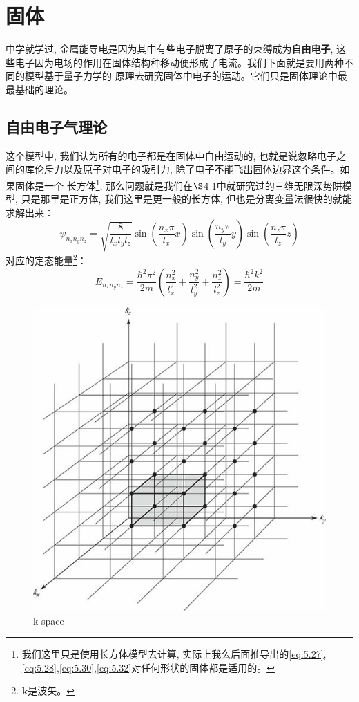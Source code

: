 \documentclass[a4paper,zihao=-4,linespread=1]{ctexrep}
\begin{document}
    \section{固体}
    中学就学过, 金属能导电是因为其中有些电子脱离了原子的束缚成为\textbf{自由电子}, 这些电子因为电场的作用在固体结构种移动便形成了电流。我们下面就是要用两种不同的模型基于量子力学的
    原理去研究固体中电子的运动。它们只是固体理论中最最基础的理论。

    \subsection{自由电子气理论}
    这个模型中, 我们认为所有的电子都是在固体中自由运动的, 也就是说忽略电子之间的库伦斥力以及原子对电子的吸引力, 除了电子不能飞出固体边界这个条件。如果固体是一个
    长方体\footnote{我们这里只是使用长方体模型去计算, 实际上我么后面推导出的\ref{eq:5.27},\ref{eq:5.28},\ref{eq:5.30},\ref{eq:5.32}对任何形状的固体都是适用的。}, 那么问题就是我们在$\S$4-1中就研究过的三维无限深势阱模型, 只是那里是正方体, 我们这里是更一般的长方体, 但也是分离变量法很快的就能求解出来：
    \begin{equation}
        \psi_{n_{x} n_{y} n_{z}}=\sqrt{\frac{8}{l_{x} l_{y} l_{z}}} \sin \left(\frac{n_{x} \pi}{l_{x}} x\right) \sin \left(\frac{n_{y} \pi}{l_{y}} y\right) \sin \left(\frac{n_{z} \pi}{l_{z}} z\right)
    \end{equation}
    对应的定态能量\footnote{$\mathbf{k}$是波矢。}：
    \begin{equation}
        \label{eq:5.25}
        E_{n_{x} n_{y} n_{z}}=\frac{\hbar^{2} \pi^{2}}{2 m}\left(\frac{n_{x}^{2}}{l_{x}^{2}}+\frac{n_{y}^{2}}{l_{y}^{2}}+\frac{n_{z}^{2}}{l_{z}^{2}}\right)=\frac{\hbar^{2} k^{2}}{2 m}
    \end{equation}
    
    \begin{figure}[htbp]
        \centering
        \includegraphics[scale=0.72]{fig/5-2.jpg}
        \caption{k-space}
        \label{fig:5-2}
    \end{figure}
    
\end{document}
